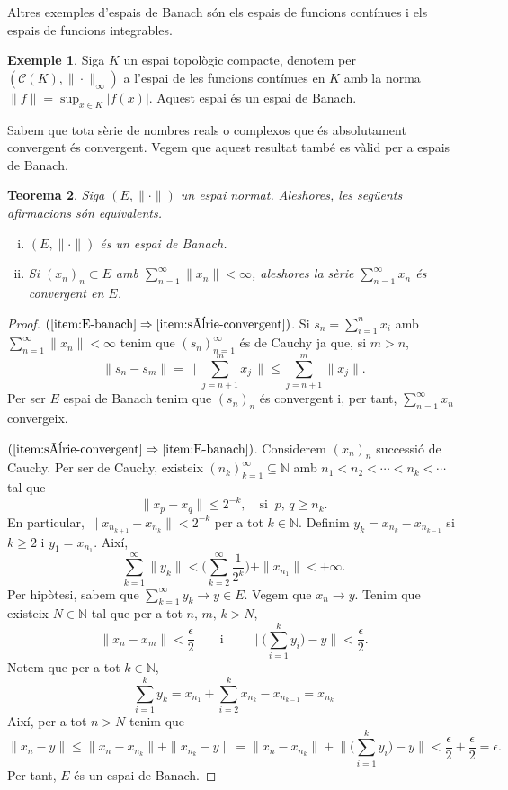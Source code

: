 \documentclass[12pt]{book}
\newtheorem{teorema}{Teorema}[chapter]
\theoremstyle{definition}
\theoremstyle{nota}
\theoremstyle{exemple}
\newtheorem{exemple}[teorema]{Exemple}
\begin{document}
Altres exemples d'espais de Banach són els espais de funcions
contínues i els espais de funcions integrables.

\begin{exemple}
  Siga $K$ un espai topològic compacte, denotem per
  $(\mathcal{C}(K), \|\cdot\|_\infty)$ a l'espai de les funcions
  contínues en $K$ amb la norma $\|f\| = \sup_{x \in K}
  |f(x)|$. Aquest espai és un espai de Banach.
\end{exemple}

Sabem que tota sèrie de nombres reals o complexos que és absolutament
convergent és convergent. Vegem que aquest resultat també es vàlid per
a espais de Banach.

\begin{teorema}
  Siga $(E, \|\cdot\|)$ un espai normat. Aleshores, les següents
  afirmacions són equivalents.
  \begin{enumerate}[(i), nosep]
  \item\label{item:E-banach} $(E, \|\cdot\|)$ és un espai de Banach.
  \item\label{item:sèrie-convergent} Si $(x_n)_n \subset E$ amb
    $\sum_{n=1}^{\infty} \|x_n\| < \infty$, aleshores la sèrie
    $\sum_{n=1}^{\infty} x_n$ és convergent en $E$.
  \end{enumerate}
\end{teorema}

\begin{proof}
  $(\ref{item:E-banach} \Rightarrow \ref{item:sèrie-convergent})$. Si
  $s_n = \sum_{i=1}^{n} x_i$ amb $\sum_{n=1}^{\infty}\|x_n\| < \infty$
  tenim que $(s_n)_{n=1}^\infty$ és de Cauchy ja que, si $m > n$,
  \[
    \|s_n - s_m\| = \Big\| \sum_{j=n+1}^{m} x_j \, \Big\|
    \leq \sum_{j=n+1}^{m} \|x_j\|.
  \]
  Per ser $E$ espai de Banach tenim que $(s_n)_n$ és convergent i, per
  tant, $\sum_{n=1}^{\infty} x_n$ convergeix.

  $(\ref{item:sèrie-convergent} \Rightarrow
  \ref{item:E-banach})$. Considerem $(x_n)_n$ successió de Cauchy. Per
  ser de Cauchy, existeix $(n_k)_{k=1}^\infty \subseteq \mathbb{N}$
  amb $n_1 < n_2 < \dotsb < n_k < \dotsb$ tal que
  \[
    \|x_p - x_q\| \leq 2^{-k}, \quad \text{si} \;\; p,\, q \geq n_k.
  \]
  En particular, $\|x_{n_{k+1}} - x_{n_k}\| < 2^{-k}$ per a tot
  $k \in \mathbb{N}$. Definim $y_k = x_{n_k} - x_{n_{k-1}}$ si
  $k \geq 2$ i $y_1 = x_{n_1}$. Així,
  \[
    \sum_{k=1}^{\infty} \|y_k\| < \Big( \sum_{k=2}^{\infty}
    \frac{1}{2^k} \Big) + \|x_{n_1}\| < + \infty.
  \]
  Per hipòtesi, sabem que $\sum_{k=1}^{\infty} y_k \to y \in E$.
  Vegem que $x_n \to y$. Tenim que existeix $N \in \mathbb{N}$ tal que
  per a tot $n,\, m,\, k > N$,
  \[
    \|x_n - x_m\| < \frac{\epsilon}{2} \qquad \text{i} \qquad \Big\|
    \Big( \sum_{i=1}^{k} y_i \Big) - y \Big\| < \frac{\epsilon}{2}.
  \]
  Notem que per a tot $k \in \mathbb{N}$,
  \[
    \sum_{i=1}^{k} y_k = x_{n_1} + \sum_{i=2}^{k} x_{n_k} -
    x_{n_{k-1}} = x_{n_k}
  \]
  Així, per a tot $n > N$ tenim que
  \[
    \|x_n - y\| \leq \|x_n - x_{n_k}\| + \|x_{n_k} - y\| = \|x_n -
    x_{n_k}\| + \Big\| \Big( \sum_{i=1}^{k} y_i \Big) - y \Big\| <
    \frac{\epsilon}{2} + \frac{\epsilon}{2} = \epsilon.
  \]
  Per tant, $E$ és un espai de Banach.
\end{proof}
\end{document}
